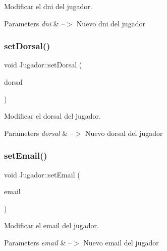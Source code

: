 Modificar el dni del jugador. 


\begin{DoxyParams}{Parameters}
{\em dni} & --$>$ Nuevo dni del jugador \\
\hline
\end{DoxyParams}
\mbox{\label{classJugador_a08e9a676f4710c0635d02e129d7cb7d0}} 
\subsubsection{\texorpdfstring{set\+Dorsal()}{setDorsal()}}
{\footnotesize\ttfamily void Jugador\+::set\+Dorsal (\begin{DoxyParamCaption}\item[{int}]{dorsal }\end{DoxyParamCaption})}



Modificar el dorsal del jugador. 


\begin{DoxyParams}{Parameters}
{\em dorsal} & --$>$ Nuevo dorsal del jugador \\
\hline
\end{DoxyParams}
\mbox{\label{classJugador_abe37872318ab13c0b6043302eb31082c}} 
\subsubsection{\texorpdfstring{set\+Email()}{setEmail()}}
{\footnotesize\ttfamily void Jugador\+::set\+Email (\begin{DoxyParamCaption}\item[{Q\+String}]{email }\end{DoxyParamCaption})}



Modificar el email del jugador. 


\begin{DoxyParams}{Parameters}
{\em email} & --$>$ Nuevo email del jugador \\
\hline
\end{DoxyParams}
\mbox{\label{classJugador_a66ae18a593fe618962a7c78fa201712a}} 
